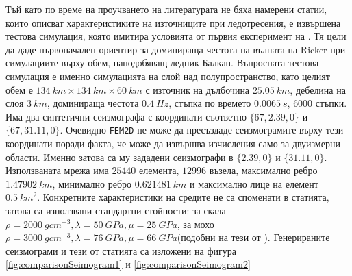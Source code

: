 \documentclass{report}
\begin{document}
	Тъй като по време на проучването на литературата не бяха намерени статии, които описват характеристиките на източниците при ледотресения, е извършена тестова симулация, която имитира условията от първия експеримент на \cite{Komatitsch2002}. Тя цели да даде първоначален ориентир за доминираща честота на вълната на Ricker при симулациите върху обем, наподобяващ ледник Балкан. Въпросната тестова симулация е именно симулацията на слой над полупространство, като целият обем 
	е $134~km \times 134~km \times 60~km$ с източник на дълбочина $25.05~km$, дебелина на слоя $3~km$, доминираща честота $0.4~Hz$, стъпка по времето $0.0065~s$, $6000$ стъпки. 
	Има два синтетични сеизмографа с координати съответно $\{67,2.39,0\}$ и $\{67,31.11,0\}$. Очевидно \texttt{FEM2D} 
	не може да пресъздаде сеизмограмите върху тези координати поради факта, че може да извършва изчисления само за двуизмерни области. Именно затова са му зададени сеизмографи в $\{2.39,0\}$ и $\{31.11,0\}$. Използваната мрежа има $25440$ елемента, $12996$ възела, максимално ребро $1.47902~km$, минимално ребро $0.621481~km$ и максимално лице на елемент $0.5~km^2$. Конкретните характеристики на средите не са споменати в статията, затова са използвани стандартни стойности: за скала $\rho=2000~gcm^{-3},\lambda=50~GPa,\mu=25~GPa$, за мохо $\rho=3000~gcm^{-3},\lambda=76~GPa,\mu=66~GPa$(подобни на тези от \cite{Dziewonski1981}). Генерираните сеизмограми и тези от статията са изложени на фигура \ref{fig:comparisonSeimogram1} и \ref{fig:comparisonSeimogram2}
	
\end{document}
